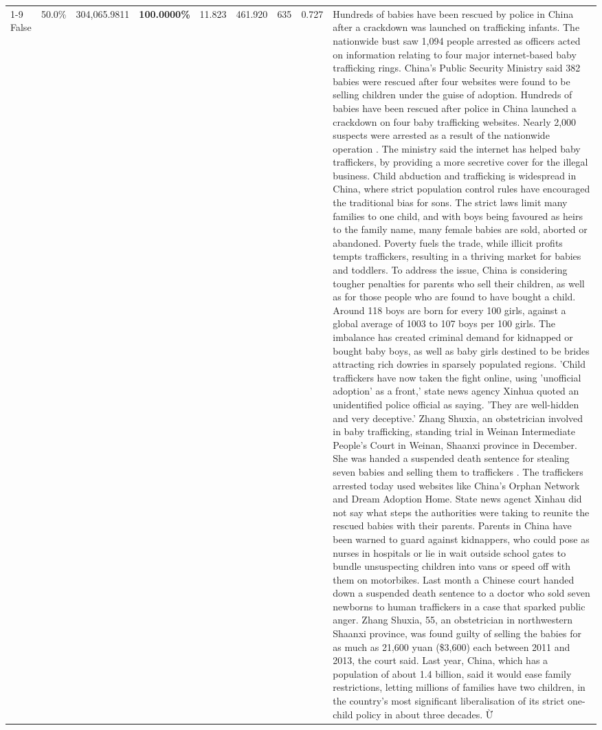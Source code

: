 \begin{table}[H]
\begin{tabular}{lllrlllll}
\cline{1-9}
False & 50.0\% & 304,065.9811 & \bfseries \color{red} 100.0000\% & 11.823 & 461.920 & 635 & 0.727 & Hundreds of babies have been rescued by police in China after a crackdown was launched on trafficking infants. The nationwide bust saw 1,094 people arrested as officers acted on information relating to four major internet-based baby trafficking rings. China's Public Security Ministry said 382 babies were rescued after four websites were found to be selling children under the guise of adoption. Hundreds of babies have been rescued after police in China launched a crackdown on four baby trafficking websites. Nearly 2,000 suspects were arrested as a result of the nationwide operation . The ministry said the internet has helped baby traffickers, by providing a more secretive cover for the illegal business. Child abduction and trafficking is widespread in China, where strict population control rules have encouraged the traditional bias for sons. The strict laws limit many families to one child, and with boys being favoured as heirs to the family name, many female babies are sold, aborted or abandoned. Poverty fuels the trade, while illicit profits tempts traffickers, resulting in a thriving market for babies and toddlers. To address the issue, China is considering tougher penalties for parents who sell their children, as well as for those people who are found to have bought a child. Around 118 boys are born for every 100 girls, against a global average of 1003 to 107 boys per 100 girls. The imbalance has created criminal demand for kidnapped or bought baby boys, as well as baby girls destined to be brides attracting rich dowries in sparsely populated regions. 'Child traffickers have now taken the fight online, using 'unofficial adoption' as a front,' state news agency Xinhua quoted an unidentified police official as saying. 'They are well-hidden and very deceptive.' Zhang Shuxia, an obstetrician involved in baby trafficking, standing trial in Weinan Intermediate People's Court in Weinan, Shaanxi province in December. She was handed a suspended death sentence for stealing seven babies and selling them to traffickers . The traffickers arrested today used websites like China's Orphan Network and Dream Adoption Home. State news agenct Xinhau did not say what steps the authorities were taking to reunite the rescued babies with their parents. Parents in China have been warned to guard against kidnappers, who could pose as nurses in hospitals or lie in wait outside school gates to bundle unsuspecting children into vans or speed off with them on motorbikes. Last month a Chinese court handed down a suspended death sentence to a doctor who sold seven newborns to human traffickers in a case that sparked public anger. Zhang Shuxia, 55, an obstetrician in northwestern Shaanxi province, was found guilty of selling the babies for as much as 21,600 yuan (\$3,600) each between 2011 and 2013, the court said. Last year, China, which has a population of about 1.4 billion, said it would ease family restrictions, letting millions of families have two children, in the country's most significant liberalisation of its strict one-child policy in about three decades. Ừ \\

\end{tabular}
\end{table}
